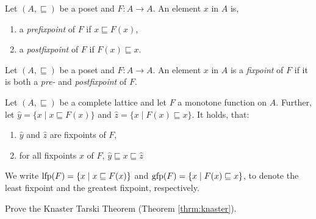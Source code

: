 \begin{definition}
Let $(A, \sqsubseteq)$ be a poset and $F: A \to A$. An element $x$ in $A$ is,
\begin{enumerate}
  \item a \emph{prefixpoint} of $F$ if $x \sqsubseteq F(x)$,
  \item a \emph{postfixpoint} of $F$ if $F(x) \sqsubseteq x$.
\end{enumerate}
\end{definition}

\begin{definition}[Fixpoint]
Let $(A, \sqsubseteq)$ be a poset and $F: A \to A$. An element $x$ in $A$ is a \emph{fixpoint} of $F$ if it is both a \emph{pre-} and \emph{postfixpoint} of $F$.
\end{definition}

\begin{theorem}
\label{thrm:knaster}
    Let $(A,\sqsubseteq)$ be a complete lattice and let $F$ a monotone function on $A$.
    Further, let $\hat{y} = \{x \mid x \sqsubseteq F(x)\}$ and $\hat{z} = \{x \mid F(x) \sqsubseteq x\}$.
    It holds, that:
    \begin{enumerate}
      \item $\hat{y}$ and $\hat{z}$ are fixpoints of $F$,
      \item for all fixpoints $x$ of $F$, $\hat{y} \sqsubseteq x \sqsubseteq \hat{z}$
    \end{enumerate}
\end{theorem}

{\flushleft We write $\mathrm{lfp}(F) = \{x \mid x \sqsubseteq F(x)\}$ and $\mathrm{gfp}(F) = \{x \mid F(x)\sqsubseteq x\}$, to denote the least fixpoint and the greatest fixpoint, respectively.}

\begin{exercise}
        Prove the Knaster Tarski Theorem (Theorem \ref{thrm:knaster}).
\end{exercise}


